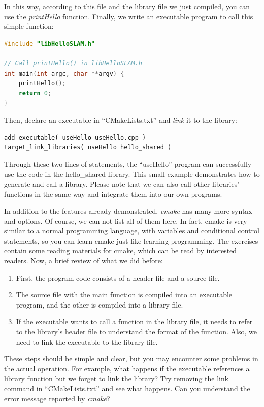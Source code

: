 In this way, according to this file and the library file we just compiled, you can use the \textit{printHello} function. Finally, we write an executable program to call this simple function:

\begin{lstlisting}[language=c++,caption=slambook2/ch2/useHello.cpp]
#include "libHelloSLAM.h"

// Call printHello() in libHelloSLAM.h
int main(int argc, char **argv) {
    printHello();
    return 0;
}
\end{lstlisting}

Then, declare an executable in ``CMakeLists.txt'' and \textit{link} it to the library:
\begin{lstlisting}[caption=slambook2/ch2/CMakeLists.txt]
add_executable( useHello useHello.cpp )
target_link_libraries( useHello hello_shared )
\end{lstlisting}

Through these two lines of statements, the ``useHello'' program can successfully use the code in the hello\_shared library. This small example demonstrates how to generate and call a library. Please note that we can also call other libraries' functions in the same way and integrate them into our own programs.

In addition to the features already demonstrated, \textit{cmake} has many more syntax and options. Of course, we can not list all of them here. In fact, cmake is very similar to a normal programming language, with variables and conditional control statements, so you can learn cmake just like learning programming. The exercises contain some reading materials for cmake, which can be read by interested readers. Now, a brief review of what we did before:

\begin{enumerate}
    \item First, the program code consists of a header file and a source file.
    \item The source file with the main function is compiled into an executable program, and the other is compiled into a library file.
    \item If the executable wants to call a function in the library file, it needs to refer to the library's header file to understand the format of the function. Also, we need to link the executable to the library file.
\end{enumerate}

These steps should be simple and clear, but you may encounter some problems in the actual operation. For example, what happens if the executable references a library function but we forget to link the library? Try removing the link command in ``CMakeLists.txt'' and see what happens. Can you understand the error message reported by \textit{cmake}?

